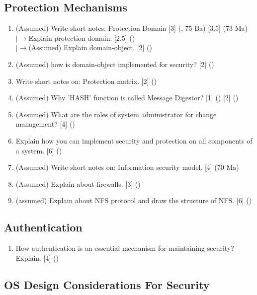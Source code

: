 \documentclass[12pt]{article}
\newcommand{\lb}{\\$\left|\rightarrow\right.$}
\begin{document}
	\subsection{Protection Mechanisms}
		\begin{enumerate}
			\item (Assumed) Write short notes: Protection Domain \hfill [3] (, 75 Ba) [3.5] (73 Ma)
			\lb Explain protection domain. \hfill [2.5] ()
			\lb (Assumed) Explain domain-object. \hfill [2] ()

			\item (Assumed) how is domain-object implemented for security? \hfill [2] ()

			\item Write short notes on: Protection matrix. \hfill [2] ()

			\item (Assumed) Why 'HASH' function is called Message Digestor? \hfill [1] () [2] ()

			\item (Assumed) What are the roles of system administrator for change management? \hfill [4] ()

			\item Explain how you can implement security and protection on all components of a system. \hfill [6] ()

			\item (Assumed) Write short notes on: Information security model. \hfill [4] (70 Ma)

			\item (Assumed) Explain about firewalls. \hfill [3] ()

			\item (assumed) Explain about NFS protocol and draw the structure of NFS. \hfill [6] ()
		\end{enumerate}

	\subsection{Authentication}
		\begin{enumerate}
			\item How authentication is an essential mechanism for maintaining security? Explain. \hfill [4] ()
		\end{enumerate}

	\subsection{OS Design Considerations For Security}
\end{document}
